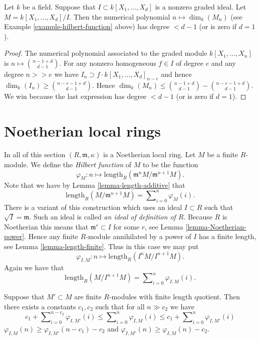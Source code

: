 \begin{lemma}
\label{lemma-quotient-smaller-d}
Let $k$ be a field. Suppose that $I \subset k[X_1,\ldots,X_d]$
is a nonzero graded ideal. Let $M = k[X_1,\ldots,X_d]/I$.
Then the numerical polynomial $n \mapsto \dim_k(M_n)$ (see
Example \ref{example-hilbert-function} above)
has degree $ < d - 1$ (or is zero if $d = 1$).
\end{lemma}

\begin{proof}
The numerical polynomial associated to the graded module
$k[X_1,\ldots,X_n]$ is $n \mapsto {n - 1 + d \choose d - 1}$.
For any nonzero homogeneous $f \in I$ of degree $e$
and any degree $n >> e$ we have $I_n \supset f \cdot k[X_1,\ldots,X_d]_{n-e}$
and hence $\dim_k(I_n) \geq {n - e - 1 + d \choose d - 1}$.
Hence $\dim_k(M_n) \leq {n - 1 + d \choose d - 1} -
{n - e - 1 + d \choose d - 1}$. We win because the last expression
has degree $ < d - 1$ (or is zero if $d = 1$).
\end{proof}








\section{Noetherian local rings}
\label{section-Noetherian-local}

\noindent
In all of this section $(R, \mathfrak m, \kappa)$
is a Noetherian local ring. 
Let $M$ be a finite $R$-module. We define the {\it Hilbert
function} of $M$ to be the function
$$
\varphi_M : n 
\longmapsto
\text{length}_R(\mathfrak m^nM/{\mathfrak m}^{n+1}M).
$$
Note that we have by Lemma \ref{lemma-length-additive}
that
$$
\text{length}_R(M / \mathfrak m^{n+1}M)
=
\sum\nolimits_{i=0}^n
\varphi_M(i).
$$
There is a variant of this construction which uses an
ideal $I \subset R$ such that $\sqrt{I} = \mathfrak m$.
Such an ideal is called {\it an ideal of definition
of $R$}. Because $R$ is Noetherian this means that
$\mathfrak m^r \subset I$ for some $r$, see Lemma
\ref{lemma-Noetherian-power}. Hence any finite $R$-module
annihilated by a power of $I$ has a finite length, see Lemma
\ref{lemma-length-finite}.
Thus in this case we may put
$$
\varphi_{I,M} : n 
\longmapsto
\text{length}_R(I^nM/I^{n+1}M).
$$
Again we have that
$$
\text{length}_R(M / I^{n+1}M)
=
\sum\nolimits_{i=0}^n
\varphi_{I,M}(i).
$$

\begin{lemma}
\label{lemma-differ-finite}
Suppose that $M' \subset M$ are finite $R$-modules
with finite length quotient. Then there exists a
constants $c_1, c_2$ such that for all $n \gg c_2$ we have
$$
c_1 + \sum\nolimits_{i = 0}^{n - c_2} \varphi_{I, M'}(i)
\leq
\sum\nolimits_{i = 0}^n \varphi_{I, M}(i)
\leq
c_1 + \sum\nolimits_{i = 0}^n \varphi_{I, M'}(i)
$$
$\varphi_{I,M}(n) \geq \varphi_{I, M'}(n-c_1) - c_2$
and $\varphi_{I, M'}(n) \geq \varphi_{I,M}(n) - c_2$.
\end{lemma}

